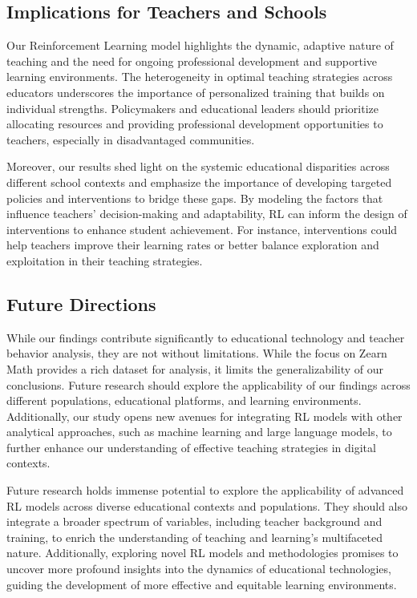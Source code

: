 \documentclass[
  number,
  preprint,
  3p,
  onecolumn]{elsarticle}
\begin{document}
\subsection{Implications for Teachers and
Schools}\label{implications-for-teachers-and-schools}

Our Reinforcement Learning model highlights the dynamic, adaptive nature
of teaching and the need for ongoing professional development and
supportive learning environments. The heterogeneity in optimal teaching
strategies across educators underscores the importance of personalized
training that builds on individual strengths. Policymakers and
educational leaders should prioritize allocating resources and providing
professional development opportunities to teachers, especially in
disadvantaged communities.

Moreover, our results shed light on the systemic educational disparities
across different school contexts and emphasize the importance of
developing targeted policies and interventions to bridge these gaps. By
modeling the factors that influence teachers' decision-making and
adaptability, RL can inform the design of interventions to enhance
student achievement. For instance, interventions could help teachers
improve their learning rates or better balance exploration and
exploitation in their teaching strategies.

\subsection{Future Directions}\label{future-directions}

While our findings contribute significantly to educational technology
and teacher behavior analysis, they are not without limitations. While
the focus on Zearn Math provides a rich dataset for analysis, it limits
the generalizability of our conclusions. Future research should explore
the applicability of our findings across different populations,
educational platforms, and learning environments. Additionally, our
study opens new avenues for integrating RL models with other analytical
approaches, such as machine learning and large language models, to
further enhance our understanding of effective teaching strategies in
digital contexts.

Future research holds immense potential to explore the applicability of
advanced RL models across diverse educational contexts and populations.
They should also integrate a broader spectrum of variables, including
teacher background and training, to enrich the understanding of teaching
and learning's multifaceted nature. Additionally, exploring novel RL
models and methodologies promises to uncover more profound insights into
the dynamics of educational technologies, guiding the development of
more effective and equitable learning environments.
\end{document}
